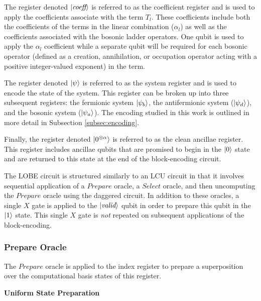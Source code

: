 The register denoted $\ket{\textit{coeff}}$ is referred to as the coefficient register and is used to apply the coefficients associate with the term $T_l$. 
These coefficients include both the coefficients of the terms in the linear combination ($\alpha_l$) as well as the coefficients associated with the bosonic ladder operators.
One qubit is used to apply the $\alpha_l$ coefficient while a separate qubit will be required for each bosonic operator (defined as a creation, annihilation, or occupation operator acting with a positive integer-valued exponent) in the term.

The register denoted $\ket{\psi}$ is referred to as the system register and is used to encode the state of the system.
This register can be broken up into three subsequent registers: the fermionic system $\ket{\psi_b}$, the antifermionic system ($\ket{\psi_d}$), and the bosonic system ($\ket{\psi_a}$).
The encoding studied in this work is outlined in more detail in Subsection \ref{subsec:encoding}.

Finally, the register denoted $\ket{0^{\otimes \alpha}}$ is referred to as the clean ancillae register.
This register includes ancillae qubits that are promised to begin in the $\ket{0}$ state and are returned to this state at the end of the block-encoding circuit.

The LOBE circuit is structured similarly to an LCU circuit in that it involves sequential application of a $\textit{Prepare}$ oracle, a $\textit{Select}$ oracle, and then uncomputing the $\textit{Prepare}$ oracle using the daggered circuit.
In addition to these oracles, a single $X$ gate is applied to the $\ket{\textit{valid}}$ qubit in order to prepare this qubit in the $\ket{1}$ state.
This single $X$ gate is \textit{not} repeated on subsequent applications of the block-encoding.

\subsubsection{Prepare Oracle}
The $\textit{Prepare}$ oracle is applied to the index register to prepare a superposition over the computational basis states of this register.

\textbf{Uniform State Preparation}

